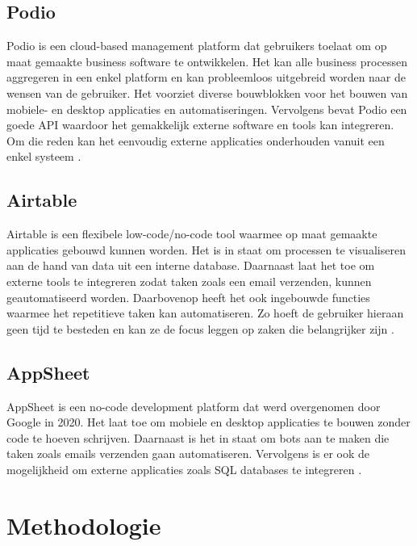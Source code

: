 \subsection{Podio}

Podio is een cloud-based management platform dat gebruikers toelaat om op maat gemaakte business software te ontwikkelen. Het kan alle business processen aggregeren in een enkel platform en kan probleemloos uitgebreid worden naar de wensen van de gebruiker. Het voorziet diverse bouwblokken voor het bouwen van mobiele- en desktop applicaties en automatiseringen. Vervolgens bevat Podio een goede API waardoor het gemakkelijk externe software en tools kan integreren. Om die reden kan het eenvoudig externe applicaties onderhouden vanuit een enkel systeem \autocite{Quivvy}.  


\subsection{Airtable}

Airtable is een flexibele low-code/no-code tool waarmee op maat gemaakte applicaties gebouwd kunnen worden. Het is in staat om processen te visualiseren aan de hand van data uit een interne database. Daarnaast laat het toe om externe tools te integreren zodat taken zoals een email verzenden, kunnen geautomatiseerd worden. Daarbovenop heeft het ook ingebouwde functies waarmee het repetitieve taken kan automatiseren. Zo hoeft de gebruiker hieraan geen tijd te besteden en kan ze de focus leggen op zaken die belangrijker zijn \autocite{Airtable}.

\subsection{AppSheet}

AppSheet is een no-code development platform dat werd overgenomen door Google in 2020. Het laat toe om mobiele en desktop applicaties te bouwen zonder code te hoeven schrijven. Daarnaast is het in staat om bots aan te maken die taken zoals emails verzenden gaan automatiseren. Vervolgens is er ook de mogelijkheid om externe applicaties zoals SQL databases te integreren \autocite{AppSheet2020}. 


\section{Methodologie}%
\label{sec:methodologie}


